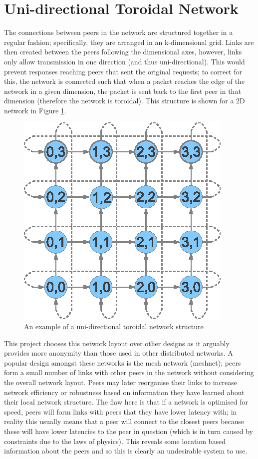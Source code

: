 \documentclass[ %
                    author={Luke Murray},
                supervisor={Dr. Simon Hollis},
                     title={Shadow Peer-to-Peer Networks},
                  subtitle={},
                    degree={MEng},
                      year={2013} ]{thesis}
\begin{document}
\section{Uni-directional Toroidal Network}
\label{sec:network_structure}

The connections between peers in the network are structured together in a regular fashion; specifically, they are arranged in an k-dimensional grid. Links are then created between the peers following the dimensional axes, however, links only allow transmission in one direction (and thus uni-directional). This would prevent responses reaching peers that sent the original requests; to correct for this, the network is connected such that when a packet reaches the edge of the network in a given dimension, the packet is sent back to the first peer in that dimension (therefore the network is toroidal). This structure is shown for a 2D network in Figure \ref{toroid}.

\begin{figure}[h]
\centering
\includegraphics{diagrams/network_toroidal.eps}
\caption{An example of a uni-directional toroidal network structure}
\label{toroid}
\end{figure}

This project chooses this network layout over other designs as it arguably provides more anonymity than those used in other distributed networks. A popular design amongst these networks is the mesh network (meshnet); peers form a small number of links with other peers in the network without considering the overall network layout. Peers may later reorganise their links to increase network efficiency or robustness based on information they have learned about their local network structure. The flaw here is that if a network is optimised for speed, peers will form links with peers that they have lower latency with; in reality this usually means that a peer will connect to the closest peers because these will have lower latencies to the peer in question (which is in turn caused by constraints due to the laws of physics). This reveals some location based information about the peers and so this is clearly an undesirable system to use.
\end{document}
